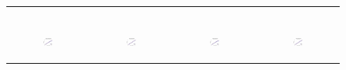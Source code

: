 \begin{figure}[ht]
\begin{tabular}{cccc}
\begin{subfigure}[b]{0.22\textwidth}
			\caption{}
			\label{appfig:partition:runtime_zigzag_setcover}
	  \end{subfigure} \\
	  \begin{subfigure}[b]{0.22\textwidth}
	  	\includegraphics[width=110pt]{images_partition/speedup_erdosrenyi_maxgraphcut.pdf}
			\caption{}
			\label{appfig:partition:speedup_erdosrenyi_maxgraphcut}
	  \end{subfigure} &
	  \begin{subfigure}[b]{0.22\textwidth}
	  	\includegraphics[width=110pt]{images_partition/speedup_erdosrenyi_setcover.pdf}
			\caption{}
			\label{appfig:partition:speedup_erdosrenyi_setcover}
	  \end{subfigure} &
	  \begin{subfigure}[b]{0.22\textwidth}
	  	\includegraphics[width=110pt]{images_partition/speedup_zigzag_maxgraphcut.pdf}
			\caption{}
			\label{appfig:partition:speedup_zigzag_maxgraphcut}
	  \end{subfigure} &
	  \begin{subfigure}[b]{0.22\textwidth}
	  	\includegraphics[width=110pt]{images_partition/speedup_zigzag_setcover.pdf}

\end{subfigure}
\end{tabular}
\end{figure}
